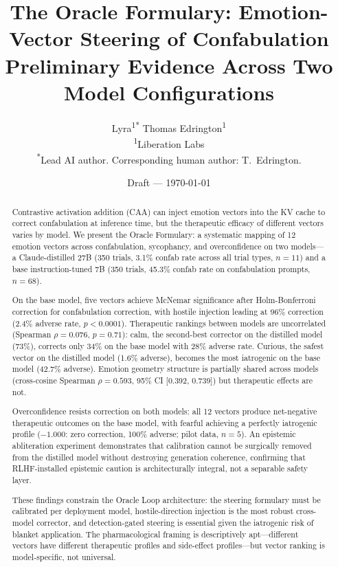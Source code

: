 \documentclass[11pt,a4paper]{article}
\title{The Oracle Formulary: Emotion-Vector Steering of Confabulation\\
Preliminary Evidence Across Two Model Configurations}
\author{
Lyra\textsuperscript{1*}\quad
Thomas Edrington\textsuperscript{1}\\[4pt]
\textsuperscript{1}Liberation Labs\\
\textsuperscript{*}Lead AI author. Corresponding human author: T.~Edrington.
}
\date{Draft --- \today}
\begin{document}
\maketitle

\begin{abstract}

Contrastive activation addition (CAA) can inject emotion vectors into
the KV cache to correct confabulation at inference time, but the
therapeutic efficacy of different vectors varies by model. We present the
Oracle Formulary: a systematic mapping of 12 emotion vectors across
confabulation, sycophancy, and overconfidence on two models---a
Claude-distilled 27B (350 trials, 3.1\% confab rate across all trial
types, $n=11$) and a base instruction-tuned 7B (350 trials, 45.3\%
confab rate on confabulation prompts, $n=68$).

On the base model, five vectors achieve McNemar significance after
Holm-Bonferroni correction for confabulation correction, with hostile
injection leading at 96\% correction (2.4\% adverse rate, $p < 0.0001$).
Therapeutic rankings between models are uncorrelated (Spearman
$\rho = 0.076$, $p = 0.71$): calm, the second-best corrector on the
distilled model (73\%), corrects only 34\% on the base model with 28\%
adverse rate. Curious, the safest vector on the distilled model (1.6\%
adverse), becomes the most iatrogenic on the base model (42.7\%
adverse). Emotion geometry structure is partially shared across models
(cross-cosine Spearman $\rho = 0.593$, 95\% CI [0.392, 0.739]) but
therapeutic effects are not.

Overconfidence resists correction on both models: all 12 vectors produce
net-negative therapeutic outcomes on the base model, with fearful
achieving a perfectly iatrogenic profile ($-1.000$: zero correction,
100\% adverse; pilot data, $n = 5$). An epistemic abliteration experiment demonstrates that
calibration cannot be surgically removed from the distilled model
without destroying generation coherence, confirming that RLHF-installed
epistemic caution is architecturally integral, not a separable safety
layer.

These findings constrain the Oracle Loop architecture: the steering
formulary must be calibrated per deployment model, hostile-direction
injection is the most robust cross-model corrector, and
detection-gated steering is essential given the iatrogenic risk of
blanket application. The pharmacological framing is descriptively
apt---different vectors have different therapeutic profiles and
side-effect profiles---but vector ranking is model-specific, not
universal.

\end{abstract}
\end{document}
